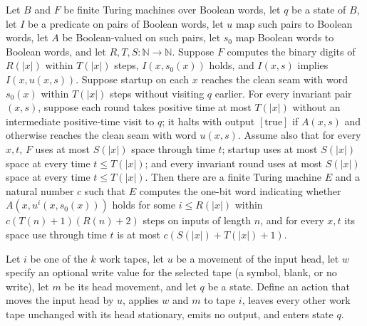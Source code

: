 \begin{theorem}
\label{Turing.FinTM.exists_loopTM_spaceUsed}
\leanok
{}
Let $B$ and $F$ be finite Turing machines over Boolean words, let $q$ be a state of $B$,
let $I$ be a predicate on pairs of Boolean words, let $u$ map such pairs to Boolean
words, let $A$ be Boolean-valued on such pairs, let $s_0$ map Boolean words to Boolean
words, and let $R,T,S : \mathbb{N} \to \mathbb{N}$. Suppose $F$ computes the binary
digits of $R(|x|)$ within $T(|x|)$ steps, $I(x,s_0(x))$ holds, and $I(x,s)$ implies
$I(x,u(x,s))$. Suppose startup on each $x$ reaches the clean seam with word $s_0(x)$
within $T(|x|)$ steps without visiting $q$ earlier. For every invariant pair $(x,s)$,
suppose each round takes positive time at most $T(|x|)$ without an intermediate
positive-time visit to $q$; it halts with output $[\mathrm{true}]$ if $A(x,s)$ and
otherwise reaches the clean seam with word $u(x,s)$. Assume also that for every $x,t$,
$F$ uses at most $S(|x|)$ space through time $t$; startup uses at most $S(|x|)$ space at
every time $t\le T(|x|)$; and every invariant round uses at most $S(|x|)$ space at
every time $t\le T(|x|)$. Then there are a finite Turing machine $E$ and a natural
number $c$ such that $E$ computes the one-bit word indicating whether
$A(x,u^i(x,s_0(x)))$ holds for some $i\le R(|x|)$ within $c(T(n)+1)(R(n)+2)$ steps on
inputs of length $n$, and for every $x,t$ its space use through time $t$ is at most
$c(S(|x|)+T(|x|)+1)$.
\end{theorem}

\begin{definition}
\label{Turing.tapeAction}
\leanok
{}
Let $i$ be one of the $k$ work tapes, let $u$ be a movement of the input head, let $w$
specify an optional write value for the selected tape (a symbol, blank, or no write),
let $m$ be its head movement, and let $q$ be a state. Define an action that moves the
input head by $u$, applies $w$ and $m$ to tape $i$, leaves every other work tape
unchanged with its head stationary, emits no output, and enters state $q$.
\end{definition}

